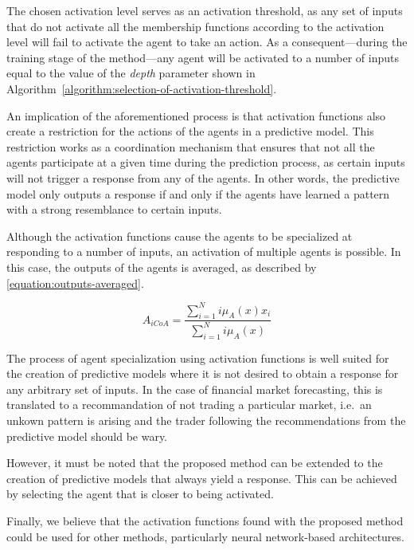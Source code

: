 \documentclass{ieeeaccess}
\begin{document}
The chosen activation level serves as an activation threshold, as any set of
inputs that do not activate all the membership functions according to the
activation level will fail to activate the agent to take an action. As a
consequent---during the training stage of the method---any agent will be
activated to a number of inputs equal to the value of the \textit{depth}
parameter shown in Algorithm~\ref{algorithm:selection-of-activation-threshold}.

An implication of the aforementioned process is that activation functions also
create a restriction for the actions of the agents in a predictive model. This
restriction works as a coordination mechanism that ensures that not all the
agents participate at a given time during the prediction process, as certain
inputs will not trigger a response from any of the agents. In other words, the
predictive model only outputs a response if and only if the agents have learned
a pattern with a strong resemblance to certain inputs.

Although the activation functions cause the agents to be specialized at
responding to a number of inputs, an activation of multiple agents is
possible. In this case, the outputs of the agents is averaged, as
described by \ref{equation:outputs-averaged}. %

\begin{equation}
  \label{equation:outputs-averaged}
  A_{iCoA} = \dfrac{\sum_{i=1}^{N} i\mu_{A}(x) x_{i}}{\sum_{i=1}^{N}
    i\mu_{A}(x)}
\end{equation}

The process of agent specialization using activation functions is well suited
for the creation of predictive models where it is not desired to obtain a
response for any arbitrary set of inputs. In the case of financial market
forecasting, this is translated to a recommandation of not trading a
particular market, i.e.\ an unkown pattern is arising and the trader following
the recommendations from the predictive model should be wary.

However, it must be noted that the proposed method can be extended to the
creation of predictive models that always yield a response. This can be
achieved by selecting the agent that is closer to being activated.

Finally, we believe that the activation functions found with the
proposed method could be used for other methods, particularly neural
network-based architectures.
\end{document}
